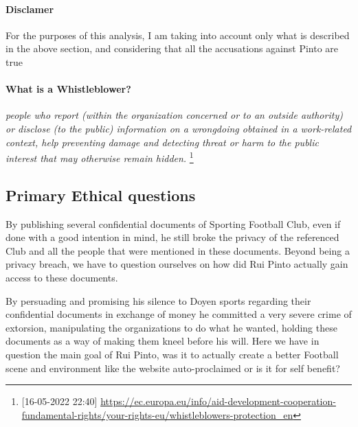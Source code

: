 \paragraph{Disclamer} For the purposes of this analysis, I am taking into account only what is described in the above section, and considering that all the accusations against Pinto are true

\paragraph{What is a Whistleblower?}
\textit{people who report (within the organization concerned or to an outside authority) or disclose (to the public) information on a wrongdoing obtained in a work-related context, help preventing damage and detecting threat or harm to the public interest that may otherwise remain hidden.}
\footnote{[16-05-2022 22:40] \url{https://ec.europa.eu/info/aid-development-cooperation-fundamental-rights/your-rights-eu/whistleblowers-protection_en}}




\subsection{Primary Ethical questions}

By publishing several confidential documents of Sporting Football Club, even if done with a good intention in mind, he still broke the privacy of the referenced Club and all the people that were mentioned in these documents.
Beyond being a privacy breach, we have to question ourselves on how did Rui Pinto actually gain access to these documents.

By persuading and promising his silence to Doyen sports regarding their confidential documents in exchange of money he committed a very severe crime of extorsion, manipulating the organizations to do what he wanted, holding these documents as a way of making them kneel before his will.
Here we have in question the main goal of Rui Pinto, was it to actually create a better Football scene and environment like the website auto-proclaimed or is it for self benefit?


